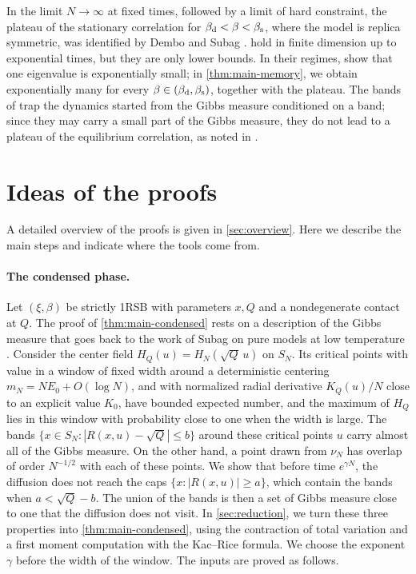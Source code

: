 In the limit $N\to\infty$ at fixed times, followed by a limit of hard constraint, the plateau of the stationary correlation for $\beta_{\mathrm d}<\beta<\beta_{\mathrm s}$, where the model is replica symmetric, was identified by Dembo and Subag \cite[Proposition~1.14 and Corollary~1.18]{DemboSubag2025}.  hold in finite dimension up to exponential times, but they are only lower bounds. In their regimes, \cite{BenArousJagannath2018,AuffingerElAlaouiSellke2025} show that one eigenvalue is exponentially small; in \cref{thm:main-memory}, we obtain exponentially many for every $\beta\in(\beta_{\mathrm d},\beta_{\mathrm s})$, together with the plateau. The bands of \cite{BenArousJagannath2024} trap the dynamics started from the Gibbs measure conditioned on a band; since they may carry a small part of the Gibbs measure, they do not lead to a plateau of the equilibrium correlation, as noted in \cite{ElAlaouiMontanariSellke2025}.

\section{Ideas of the proofs}\label{sec:intro-ideas}

A detailed overview of the proofs is given in \cref{sec:overview}. Here we describe the main steps and indicate where the tools come from.

\paragraph{The condensed phase.}
Let $(\xi,\beta)$ be strictly 1RSB with parameters $x,Q$ and a nondegenerate contact at $Q$. The proof of \cref{thm:main-condensed} rests on a description of the Gibbs measure that goes back to the work of Subag on pure models at low temperature \cite{Subag2017geometry}. Consider the center field $H_Q(u)=H_N(\sqrt Q\,u)$ on $S_N$. Its critical points with value in a window of fixed width around a deterministic centering $m_N=NE_0+O(\log N)$, and with normalized radial derivative $K_Q(u)/N$ close to an explicit value $K_0$, have bounded expected number, and the maximum of $H_Q$ lies in this window with probability close to one when the width is large. The bands $\{x\in S_N:|R(x,u)-\sqrt Q|\le b\}$ around these critical points $u$ carry almost all of the Gibbs measure. On the other hand, a point drawn from $\nu_N$ has overlap of order $N^{-1/2}$ with each of these points. We show that before time $e^{\gamma N}$, the diffusion does not reach the caps $\{x:|R(x,u)|\ge a\}$, which contain the bands when $a<\sqrt Q-b$. The union of the bands is then a set of Gibbs measure close to one that the diffusion does not visit. In \cref{sec:reduction}, we turn these three properties into \cref{thm:main-condensed}, using the contraction of total variation and a first moment computation with the Kac--Rice formula. We choose the exponent $\gamma$ before the width of the window. The inputs are proved as follows.

